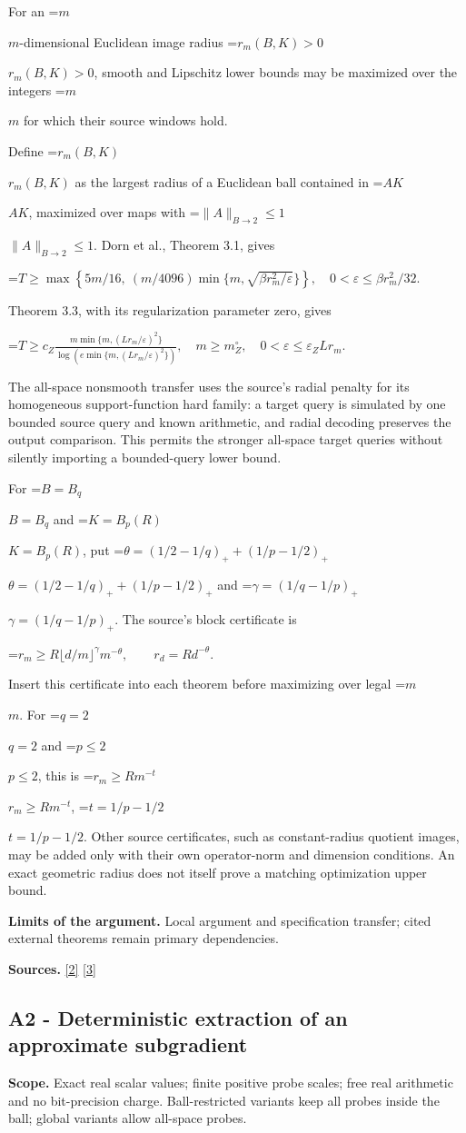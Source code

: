 \documentclass[10pt,a4paper]{article}
\newcommand{\AtlasMath}[1]{\par\begingroup\centering\setbox0=\hbox{$\displaystyle #1$}\ifdim\wd0>1.4\linewidth\typeout{ATLAS WIDE FORMULA: \the\wd0}\fi\ifdim\wd0>\linewidth\resizebox{\linewidth}{!}{\box0}\else\box0\fi\par\endgroup}
\newcommand{\AtlasInlineMath}[1]{\begingroup\setbox0=\hbox{$#1$}\ifdim\wd0>.4\linewidth\endgroup\AtlasMath{#1}\else\endgroup$#1$\fi}
\begin{document}
For an \AtlasInlineMath{m}-dimensional Euclidean image radius \AtlasInlineMath{r_m(B,K)>0}, smooth and Lipschitz lower bounds may be maximized over the integers \AtlasInlineMath{m} for which their source windows hold.

Define \AtlasInlineMath{r_m(B,K)} as the largest radius of a Euclidean ball contained in \AtlasInlineMath{AK}, maximized over maps with \AtlasInlineMath{\|A\|_{B\to2}\le1}. Dorn et al., Theorem 3.1, gives

\AtlasMath{T\ge\max\left\{5m/16,\ (m/4096)\min\{m,\sqrt{\beta r_m^2/\varepsilon}\}\right\},\quad0<\varepsilon\le\beta r_m^2/32.}

Theorem 3.3, with its regularization parameter zero, gives

\AtlasMath{T\ge c_Z\frac{m\min\{m,(Lr_m/\varepsilon)^2\}}{\log(e\min\{m,(Lr_m/\varepsilon)^2\})},\quad m\ge m_Z^\circ,\quad0<\varepsilon\le\varepsilon_ZLr_m.}

The all-space nonsmooth transfer uses the source's radial penalty for its homogeneous support-function hard family: a target query is simulated by one bounded source query and known arithmetic, and radial decoding preserves the output comparison. This permits the stronger all-space target queries without silently importing a bounded-query lower bound.

For \AtlasInlineMath{B=B_q} and \AtlasInlineMath{K=B_p(R)}, put \AtlasInlineMath{\theta=(1/2-1/q)_++(1/p-1/2)_+} and \AtlasInlineMath{\gamma=(1/q-1/p)_+}. The source's block certificate is

\AtlasMath{r_m\ge R\lfloor d/m\rfloor^\gamma m^{-\theta},\qquad r_d=Rd^{-\theta}.}

Insert this certificate into each theorem before maximizing over legal \AtlasInlineMath{m}. For \AtlasInlineMath{q=2} and \AtlasInlineMath{p\le2}, this is \AtlasInlineMath{r_m\ge Rm^{-t}}, \AtlasInlineMath{t=1/p-1/2}. Other source certificates, such as constant-radius quotient images, may be added only with their own operator-norm and dimension conditions. An exact geometric radius does not itself prove a matching optimization upper bound.

\textbf{Limits of the argument.} Local argument and specification transfer; cited external theorems remain primary dependencies.

\textbf{Sources.} \href{https://arxiv.org/html/2610.00345v1}{[2]} \href{https://arxiv.org/html/2607.16558v2}{[3]}

\subsection{A2 - Deterministic extraction of an approximate subgradient}
\textbf{Scope.} Exact real scalar values; finite positive probe scales; free real arithmetic and no bit-precision charge. Ball-restricted variants keep all probes inside the ball; global variants allow all-space probes.
\end{document}
